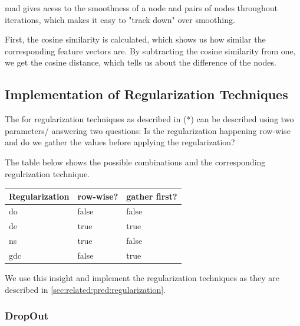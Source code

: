 \Ac{mad} gives acess to the smoothness of a node and pairs of nodes throughout iterations, which makes it easy to "track down" over smoothing.

First, the cosine similarity is calculated, which shows us how similar the corresponding feature vectors are. By subtracting the cosine similarity from one, we get the cosine distance, which tells us about the difference of the nodes.


\subsection{Implementation of Regularization Techniques}
\label{sec:implement:setup: regularization}



The for regularization techniques as described in (*)
can be described using two parameters/ answering two questions: Is the regularization happening row-wise and do we gather the values before applying the regularization?

The table below shows the possible combinations and the corresponding regulrization technique.
\begin{center}
    \begin{tabular}{lll}
        \toprule
        \textbf{Regularization} & \textbf{row-wise?} & \textbf{gather first?} \\
        \midrule
        \acf{do}                & false              & false                  \\
        \acf{de}                & true               & true                   \\
        \acf{ns}                & true               & false                  \\
        \acf{gdc}               & false              & true                   \\

        \bottomrule
    \end{tabular}
\end{center}


We use this insight and implement the regularization techniques as they are described in \cref{sec:related:pred:regularization}.

\subsubsection{DropOut}

